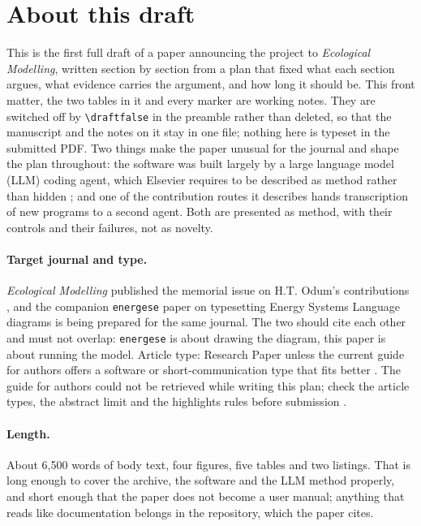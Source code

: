 \maketitle

\ifdraft
\section*{About this draft}
% 
This is the first full draft of a paper announcing the project to \emph{Ecological Modelling}, written section by section from a plan that fixed what each section argues, what evidence carries the argument, and how long it should be. This front matter, the two tables in it and every \verify{} marker are working notes. They are switched off by \texttt{\textbackslash draftfalse} in the preamble rather than deleted, so that the manuscript and the notes on it stay in one file; nothing here is typeset in the submitted PDF. Two things make the paper unusual for the journal and shape the plan throughout: the software was built largely by a large language model (LLM) coding agent, which Elsevier requires to be described as method rather than hidden \citep{elsevierAI}; and one of the contribution routes it describes hands transcription of new programs to a second agent. Both are presented as method, with their controls and their failures, not as novelty.

\paragraph{Target journal and type.} \emph{Ecological Modelling} published the memorial issue on H.T. Odum's contributions \citep{brown2004}, and the companion \texttt{energese} paper on typesetting Energy Systems Language diagrams is being prepared for the same journal. The two should cite each other and must not overlap: \texttt{energese} is about drawing the diagram, this paper is about running the model. Article type: Research Paper unless the current guide for authors offers a software or short-communication type that fits better \verify. The guide for authors could not be retrieved while writing this plan; check the article types, the abstract limit and the highlights rules before submission \verify.

\paragraph{Length.} About 6{,}500 words of body text, four figures, five tables and two listings. That is long enough to cover the archive, the software and the LLM method properly, and short enough that the paper does not become a user manual; anything that reads like documentation belongs in the repository, which the paper cites.

